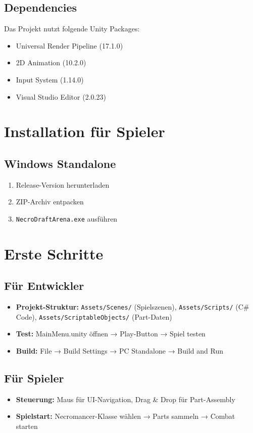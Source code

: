 \subsection{Dependencies}
Das Projekt nutzt folgende Unity Packages:
\begin{itemize}
    \item Universal Render Pipeline (17.1.0)
    \item 2D Animation (10.2.0)
    \item Input System (1.14.0)
    \item Visual Studio Editor (2.0.23)
\end{itemize}

\section{Installation für Spieler}

\subsection{Windows Standalone}
\begin{enumerate}
    \item Release-Version herunterladen
    \item ZIP-Archiv entpacken
    \item \texttt{NecroDraftArena.exe} ausführen
\end{enumerate}

\section{Erste Schritte}

\subsection{Für Entwickler}
\begin{itemize}
    \item \textbf{Projekt-Struktur:} \texttt{Assets/Scenes/} (Spielszenen), \texttt{Assets/Scripts/} (C\# Code), \texttt{Assets/ScriptableObjects/} (Part-Daten)
    \item \textbf{Test:} MainMenu.unity öffnen → Play-Button → Spiel testen
    \item \textbf{Build:} File → Build Settings → PC Standalone → Build and Run
\end{itemize}

\subsection{Für Spieler}
\begin{itemize}
    \item \textbf{Steuerung:} Maus für UI-Navigation, Drag \& Drop für Part-Assembly
    \item \textbf{Spielstart:} Necromancer-Klasse wählen → Parts sammeln → Combat starten
\end{itemize}
